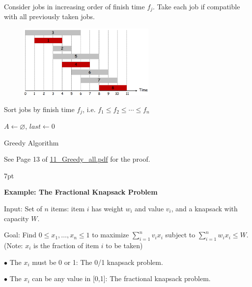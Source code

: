 \documentclass[10pt]{article}
\newenvironment{formal}[2]{%
	\def\FrameCommand{%
		\hspace{1pt}%
		{\color{#1}\vrule width 2pt}%
		{\color{#2}\vrule width 4pt}%
		\colorbox{#2}%
	}%
	\MakeFramed{\advance\hsize-\width\FrameRestore}%
	\noindent\hspace{-4.55pt}%
	\begin{adjustwidth}{}{7pt}%
		\vspace{2pt}\vspace{2pt}%
	}
	{%
		\vspace{2pt}\end{adjustwidth}\endMakeFramed%
}
\begin{document}
Consider jobs in increasing order of finish time $f_j$. Take each job if compatible with all previously taken jobs.
\begin{figure}[h]
	\centering
	\includegraphics[width=0.6\textwidth]{img5-3}
\end{figure}
\begin{algorithm}
	\SetAlgoLined
	Sort jobs by finish time $f_j$, i.e. $f_1 \leq f_2 \leq \cdots \leq f_n$

	$A \gets \varnothing$, $last \gets 0$



	\caption{Greedy Algorithm}
\end{algorithm}

See Page 13 of \href{C:/Users/user/OneDrive\%20-\%20HKUST\%20Connect/University/Computer/Design\%20and\%20Analysis\%20of\%20Algorithms/Lecture\%20Notes/11_Greedy_all.pdf\#page=13}{11\_Greedy\_all.pdf} for the proof.

\begin{formal}{Brown}{brownshade}
	
	\textbf{Example: The Fractional Knapsack Problem}

	Input: Set of $n$ items: item $i$ has weight $w_i$ and value $v_i$, and a knapsack with capacity $W$.

	Goal: Find $0 \leq x_1, \dots, x_n \leq 1$ to maximize $\sum_{i=1}^n v_i x_i$ subject to $\sum_{i=1}^n w_i x_i \leq W$.
	(Note: $x_i$ is the fraction of item $i$ to be taken)

	$\bullet$ The $x_i$ must be 0 or 1: The 0/1 knapsack problem.

	$\bullet$ The $x_i$ can be any value in [0,1]: The fractional knapsack problem.

\end{formal}
\end{document}
